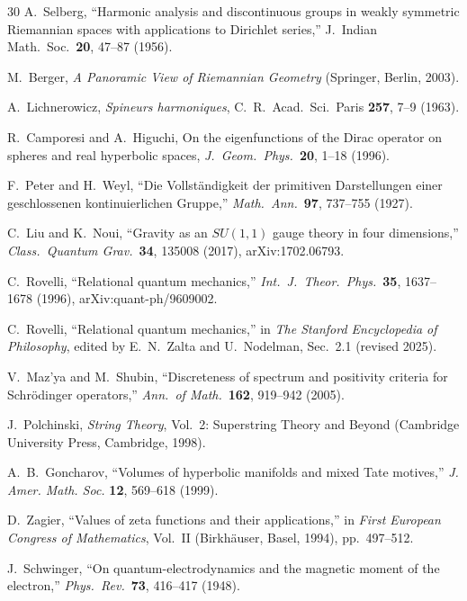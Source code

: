\documentclass[aps,pra,twocolumn,superscriptaddress,longbibliography]{revtex4-2}
\begin{document}
\begin{thebibliography}{30}
A.~Selberg,
``Harmonic analysis and discontinuous groups in weakly symmetric
Riemannian spaces with applications to Dirichlet series,''
J.\ Indian Math.\ Soc.\ \textbf{20}, 47--87 (1956).

M.~Berger,
\textit{A Panoramic View of Riemannian Geometry}
(Springer, Berlin, 2003).

A.~Lichnerowicz,
\textit{Spineurs harmoniques},
C.~R.\ Acad.\ Sci.\ Paris \textbf{257}, 7--9 (1963).

R.~Camporesi and A.~Higuchi,
On the eigenfunctions of the Dirac operator on spheres and
real hyperbolic spaces,
\textit{J.\ Geom.\ Phys.}\ \textbf{20}, 1--18 (1996).

F.~Peter and H.~Weyl,
``Die Vollst\"andigkeit der primitiven Darstellungen einer
geschlossenen kontinuierlichen Gruppe,''
\textit{Math.\ Ann.}\ \textbf{97}, 737--755 (1927).

C.~Liu and K.~Noui, ``Gravity as an $SU(1,1)$ gauge theory in four
dimensions,'' \textit{Class.\ Quantum Grav.}\ \textbf{34}, 135008 (2017),
arXiv:1702.06793.

C.~Rovelli, ``Relational quantum mechanics,''
\textit{Int.\ J.\ Theor.\ Phys.}\ \textbf{35}, 1637--1678 (1996),
arXiv:quant-ph/9609002.

C.~Rovelli, ``Relational quantum mechanics,'' in
\textit{The Stanford Encyclopedia of Philosophy}, edited by E.~N.~Zalta and
U.~Nodelman, Sec.~2.1 (revised 2025).

V.~Maz'ya and M.~Shubin, ``Discreteness of spectrum and positivity criteria
for Schr\"odinger operators,''
\textit{Ann.\ of Math.}\ \textbf{162}, 919--942 (2005).

J.~Polchinski,
\textit{String Theory}, Vol.~2: Superstring Theory and Beyond
(Cambridge University Press, Cambridge, 1998).

A.~B.~Goncharov,
``Volumes of hyperbolic manifolds and mixed Tate motives,''
\textit{J. Amer. Math. Soc.} \textbf{12}, 569--618 (1999).

D.~Zagier,
``Values of zeta functions and their applications,''
in \textit{First European Congress of Mathematics}, Vol.~II
(Birkh\"auser, Basel, 1994), pp.~497--512.

J.~Schwinger,
``On quantum-electrodynamics and the magnetic moment of the electron,''
\textit{Phys.\ Rev.}\ \textbf{73}, 416--417 (1948).


\end{thebibliography}
\end{document}
